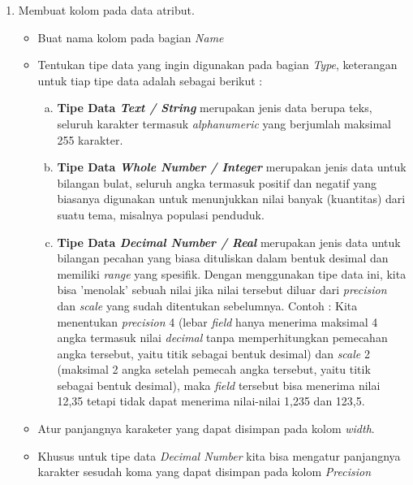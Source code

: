 \begin{enumerate}[1.]
  \item Membuat kolom pada data atribut.
  
  \begin{itemize}
  
    \item Buat nama kolom pada bagian \textit{Name}
    
    \item Tentukan tipe data yang ingin digunakan pada bagian \textit{Type}, keterangan untuk tiap tipe data adalah sebagai berikut :
    
    \begin{enumerate}[a.]
    
      \item \textbf{Tipe Data \textit{Text / String}} merupakan jenis data berupa teks, seluruh karakter termasuk \textit{alphanumeric} yang berjumlah maksimal 255 karakter.
      
      \item \textbf{Tipe Data \textit{Whole Number / Integer}} merupakan jenis data untuk bilangan bulat, seluruh angka termasuk positif dan negatif yang biasanya digunakan untuk menunjukkan nilai banyak (kuantitas) dari suatu tema, misalnya populasi penduduk.
      
      \item \textbf{Tipe Data \textit{Decimal Number / Real}} merupakan jenis data untuk bilangan pecahan yang biasa dituliskan dalam bentuk desimal dan memiliki \textit{range} yang spesifik. Dengan menggunakan tipe data ini, kita bisa 'menolak' sebuah nilai jika nilai tersebut diluar dari \textit{precision} dan \textit{scale} yang sudah ditentukan sebelumnya. Contoh : Kita menentukan \textit{precision} 4 (lebar \textit{field} hanya menerima maksimal 4 angka termasuk nilai \textit{decimal} tanpa memperhitungkan pemecahan angka tersebut, yaitu titik sebagai bentuk desimal) dan \textit{scale} 2 (maksimal 2 angka setelah pemecah angka tersebut, yaitu titik sebagai bentuk desimal), maka \textit{field} tersebut bisa menerima nilai 12,35 tetapi tidak dapat menerima nilai-nilai 1,235 dan 123,5. 
    
    \end{enumerate}
    
    \item Atur panjangnya karaketer yang dapat disimpan pada kolom \textit{width}.
    
    \item Khusus untuk tipe data \textit{Decimal Number} kita bisa mengatur panjangnya karakter sesudah koma yang dapat disimpan pada kolom \textit{Precision}
    

\end{itemize}
\end{enumerate}
